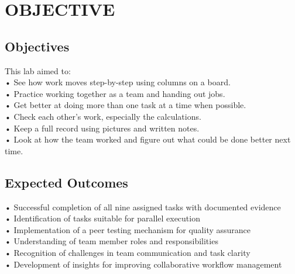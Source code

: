 \chapter{OBJECTIVE}\label{obj}



\section{Objectives}

This lab aimed to:\\
• See how work moves step-by-step using columns on a board.\\
• Practice working together as a team and handing out jobs.\\
• Get better at doing more than one task at a time when possible.\\
• Check each other’s work, especially the calculations.\\
• Keep a full record using pictures and written notes.\\
• Look at how the team worked and figure out what could be done better next time.




\section{Expected Outcomes}
• Successful completion of all nine assigned tasks with documented evidence\\
• Identification of tasks suitable for parallel execution\\
• Implementation of a peer testing mechanism for quality assurance\\
• Understanding of team member roles and responsibilities\\
• Recognition of challenges in team communication and task clarity\\
• Development of insights for improving collaborative workflow management\\

